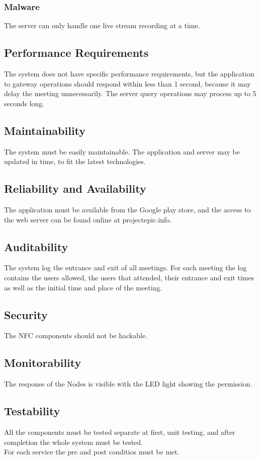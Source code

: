 \documentclass[a4paper,12pt,titlepage]{article}
\begin{document}
\subsubsection{Malware} The server can only handle one live stream recording at a time.

\subsection{Performance Requirements}
The system does not have specific performance requirements, but the application to gateway operations should respond within less than 1 second, because it may delay the meeting unnecessarily. The server query operations may process up to 5 seconds long.

\subsection{Maintainability}
The system must be easily maintainable. The application and server may be updated in time, to fit the latest technologies. 

\subsection{Reliability and Availability}
The application must be available from the Google play store, and the access to the web server can be found online at projectepic.info.

\subsection{Auditability}
The system log the entrance and exit of all meetings. For each meeting the log contains the users allowed, the users that attended, their entrance and exit times as well as the initial time and place of the meeting.

\subsection{Security}
The NFC components should not be hackable. 

\subsection{Monitorability}
The response of the Nodes is visible with the LED light showing the permission.

\subsection{Testability}
All the components must be tested separate at first, unit testing, and after completion the whole system must be tested.
\\ For each service the pre and post conditios must be met.
\end{document}
